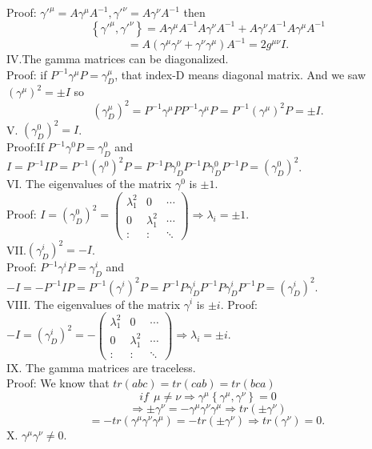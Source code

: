 \documentclass[twocolumn,aps,prb,showpacs]{revtex4-1}
\begin{document}
Proof: $\gamma'^{\mu}=A\gamma^{\mu}A^{-1},\gamma'^{\nu}=A\gamma^{\nu}A^{-1} $ then
$$
\left\lbrace\gamma'^{\mu},\gamma'^{\nu}\right\rbrace=A\gamma^{\mu}A^{-1}A\gamma^{\nu}A^{-1}+A\gamma^{\nu}A^{-1}A\gamma^{\mu}A^{-1}$$
$$
=A(\gamma^{\mu}\gamma^{\nu}+\gamma^{\nu}\gamma^{\mu})A^{-1}=2g^{\mu\nu}I. $$
IV.The gamma matrices can be diagonalized.	 \\
Proof: if $P^{-1}\gamma^{\mu}P=\gamma^{\mu}_{D}$, that index-D means diagonal matrix. And we saw $(\gamma^{\mu})^{2}=\pm I$ so
$$
(\gamma^{\mu}_{D})^{2}=P^{-1}\gamma^{\mu}PP^{-1}\gamma^{\mu}P
=P^{-1}(\gamma^{\mu})^{2}P=\pm I.$$
V.	$(\gamma^{0}_{D})^{2}=I$.\\
Proof:If $P^{-1}\gamma^{0}P=\gamma^{0}_{D}$ and $I=P^{-1}IP=P^{-1}(\gamma^{0})^{2}P=P^{-1}P\gamma^{0}_{D}P^{-1}P\gamma^{0}_{D}P^{-1}P=(\gamma^{0}_{D})^{2}$.\\
VI.	The eigenvalues of the matrix $\gamma^{0}$ is $\pm1$.\\
Proof:
$I=(\gamma^{0}_{D})^{2}=
\begin{pmatrix}
\lambda_{1}^{2} & 0 & \cdots \\
0 & \lambda_{1}^{2} & \cdots \\
\colon &\colon &\ddots
\end{pmatrix}\Rightarrow \lambda_{i}=\pm1
$. \\
VII.$(\gamma^{i}_{D})^{2}=-I$.\\	
Proof: $P^{-1}\gamma^{i}P=\gamma^{i}_{D}$ and $-I=-P^{-1}IP=P^{-1}(\gamma^{i})^{2}P=P^{-1}P\gamma^{i}_{D}P^{-1}P\gamma^{i}_{D}P^{-1}P=(\gamma^{i}_{D})^{2}$.\\
VIII.	The eigenvalues of the matrix $\gamma^{i}$ is $\pm i$.
Proof: $-I=(\gamma^{i}_{D})^{2}=
-\begin{pmatrix}
\lambda_{1}^{2} & 0 & \cdots \\
0 & \lambda_{1}^{2} & \cdots \\
\colon &\colon &\ddots
\end{pmatrix}\Rightarrow \lambda_{i}=\pm i.
$ \\
IX.	The gamma matrices are traceless. \\
Proof: We know that $tr(abc)=tr(cab)=tr(bca)$
$$
if \ \ \mu\neq\nu\Rightarrow \gamma^{\mu}\left\lbrace\gamma^{\mu},\gamma^{\nu} \right\rbrace=0 $$ 
$$
\Rightarrow\pm\gamma^{\nu}=-\gamma^{\mu}\gamma^{\nu}\gamma^{\mu}\Rightarrow tr(\pm\gamma^{\nu})$$
$$=-tr(\gamma^{\mu}\gamma^{\nu}\gamma^{\mu}) 
=-tr(\pm\gamma^{\nu})\Rightarrow tr(\gamma^{\nu})=0. \ 
$$
X.	$\gamma^{\mu}\gamma^{\nu}\neq 0$.\\
\end{document}
